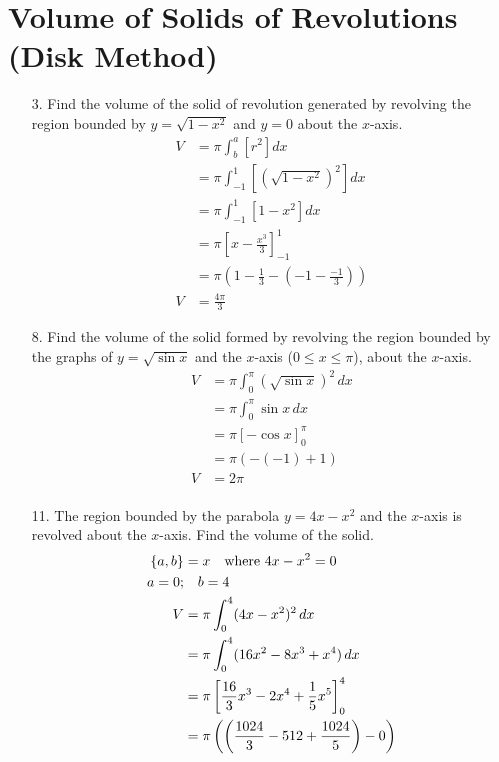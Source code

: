 \documentclass[12pt]{article}
\begin{document}
\section{Volume of Solids of Revolutions (Disk Method)}
\begin{enumerate}
    \item[3.] Find the volume of the solid of revolution generated by revolving the region bounded by $y=\sqrt{1-x^2}$ and $y=0$ about the $x$-axis.
    \begin{align*}
        V&=\pi\int^a_b\left[r^2\right]dx \\
         &=\pi\int^1_{-1}\left[\left(\sqrt{1-x^2}\right)^2\right]dx \\
         &=\pi\int^1_{-1}\left[1-x^2\right]dx \\
         &=\pi\left[x-\frac{x^3}{3}\right]^1_{-1} \\
         &=\pi\left(1-\frac{1}{3}-\left(-1-\frac{-1}{3}\right)\right) \\
        V&=\frac{4\pi}{3}
    \end{align*}
    \item[8.]Find the volume of the solid formed by revolving the region bounded by the graphs of \( y = \sqrt{\sin x} \) and the \( x \)-axis (\( 0 \leq x \leq \pi \)), about the \( x \)-axis.
    \begin{align*}
        V&= \pi \int_{0}^{\pi} (\sqrt{\sin x})^2 \, dx \\
         &= \pi \int_{0}^{\pi} \sin x \, dx \\
         &= \pi \left[ -\cos x \right]_{0}^{\pi} \\
         &= \pi \left( -(-1) + 1 \right) \\
        V&=2\pi \\
    \end{align*}
    \item[11.] The region bounded by the parabola \( y = 4x - x^2 \) and the \( x \)-axis is revolved about the \( x \)-axis. Find the volume of the solid.
    \begin{align*}
        \{a,b\}&=x \text{\quad where }4x-x^2=0 \\
        a=0 ;&\quad b=4 \\
        V &= \pi \int_{0}^{4} (4x - x^2)^2 \, dx \\
        &=\pi \int_{0}^{4} (16x^2 - 8x^3 + x^4) \, dx \\
        &=\pi \left[ \frac{16}{3}x^3 - 2x^4 + \frac{1}{5}x^5 \right]_{0}^{4} \\
        &=\pi\left(\left(\frac{1024}{3}-512+\frac{1024}{5}\right)-0\right)\\

\end{align*}
\end{enumerate}
\end{document}
